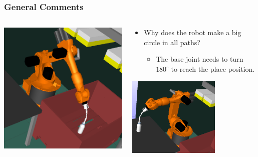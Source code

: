\documentclass{beamer}
\begin{document}
\begin{frame}
  \frametitle{General Comments}
  \begin{columns}
    \begin{column}{0.4\textwidth}
      \begin{center}
        \includegraphics[width=\textwidth]{./pick}
      \end{center}
    \end{column}
    \begin{column}{0.6\textwidth}
      \begin{itemize}
      \item Why does the robot make a big circle in all paths?
        \begin{itemize}
        \item The base joint needs to turn $180^{\circ}$ to reach the place position.
        \end{itemize}
      \end{itemize}
      \begin{center}
        \includegraphics[width=0.6666\textwidth]{./place}
      \end{center}
    \end{column}
  \end{columns}
\end{frame}
\end{document}
